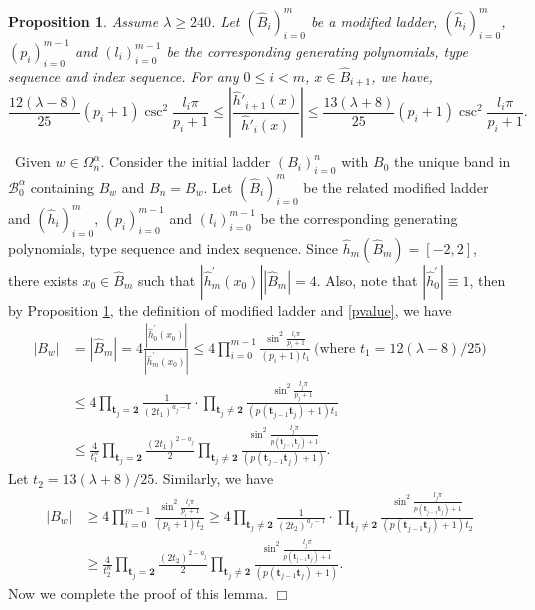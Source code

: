 \documentclass[reqno,11pt,graphicx,]{amsart}
\numberwithin{equation}{section}
\theoremstyle{plain}
\newcommand{\3}{\mathbf{3}}
\newtheorem{proposition}[theorem]{Proposition}
\begin{document}
	\begin{proposition}\label{lm-2}
		Assume $\lambda\ge240$. Let $(\hat{B}_i)_{i=0}^m$ be a modified ladder,
		$(\hat{h}_i)_{i=0}^m$, $(p_i)_{i=0}^{m-1}$ and $(l_i)_{i=0}^{m-1}$
		be the corresponding generating polynomials, type sequence and index sequence.
		For any $0\le i< m$, $x\in \hat{B}_{i+1}$, we have,
		$$\frac{12(\lambda-8)}{25}(p_i+1)\csc^2\frac{l_i\pi}{p_i+1}
		\le\left|\frac{\hat{h}'_{i+1}(x)}{\hat{h}'_{i}(x)}\right|
		\le \frac{13(\lambda+8)}{25}(p_i+1)\csc^2\frac{l_i\pi}{p_i+1}.$$
	\end{proposition}
	
	\smallskip
	
	\
	Given $w\in \Omega^{\alpha}_n.$  Consider the initial ladder $(B_i)_{i=0}^n$ with $B_0$ the unique band in $\mathcal{B}^{\alpha}_0$ containing $B_w$ and $B_n=B_w.$
	Let $(\hat{B}_i)_{i=0}^m$ be the related  modified ladder and
	$(\hat{h}_i)_{i=0}^m$, $(p_i)_{i=0}^{m-1}$ and $(l_i)_{i=0}^{m-1}$
	be the corresponding generating polynomials, type sequence and index
	sequence.
	Since $\hat h_m(\hat B_m)=[-2,2]$, there exists $x_0\in\hat B_m$
	such that $|\hat h_m^\prime(x_0)| |\hat B_m|=4.$
	Also, note that
	$|\hat{h}_{0}^\prime|\equiv 1$,
	then by Proposition \ref{lm-2}, the definition of  modified ladder and \eqref{pvalue}, we have 
	\begin{align*}
		|B_w|&=|\hat{B}_m|= 4\frac{|\hat h_0^\prime(x_0)|}{|\hat h_m^\prime(x_0)|}\le 4
		\prod_{i=0}^{m-1}\frac{\sin^2\frac{l_i\pi}{p_i+1}}{(p_i+1)t_1}\ \text{(where $t_1=12(\lambda-8)/25$)}\\
&\le4\prod_{\mathbf{t}_j=\mathbf{2}}\frac{1}{(2t_1)^{a_j-1}}\cdot \prod_{\mathbf{t}_{j}\neq\mathbf{2}}
		\frac{\sin^2\frac{l_j\pi}{p_j+1}}{(p(\mathbf{t}_{j-1}\mathbf{t}_j)+1)t_1}\\
		&\leq\frac{4}{t_1^n}\prod_{\mathbf{t}_j=\mathbf{2}}\frac{(2t_1)^{2-a_j}}{2}\prod_{\mathbf{t}_j\neq\mathbf{2}}\frac{\sin^2\frac{l_j\pi}{p(\mathbf{t}_{j-1}\mathbf{t}_j)+1}}{(p(\mathbf{t}_{j-1}\mathbf{t}_j)+1)}.
	\end{align*}
Let $t_2=13(\lambda+8)/25$.	Similarly, we have
	\begin{align*}
		|B_w|&\ge  4
		\prod_{i=0}^{m-1}\frac{\sin^2\frac{l_i\pi}{p_i+1}}{(p_i+1)t_2}\ge4\prod_{\mathbf{t}_{j}\neq\mathbf{2}}\frac{1}{(2t_2)^{a_j-1}}\cdot \prod_{\mathbf{t}_j\neq\mathbf{2}}\frac{\sin^2\frac{l_j\pi}{p(\mathbf{t}_{j-1}\mathbf{t}_j)+1}}{(p(\mathbf{t}_{j-1}\mathbf{t}_j)+1)t_2}\\
		&\ge\frac{			4}{t_2^n}\prod_{\mathbf{t}_j=\mathbf{2}}\frac{(2t_2)^{2-a_j}}{2}\prod_{\mathbf{t}_j\neq\mathbf{2}}\frac{\sin^2\frac{l_j\pi}{p(\mathbf{t}_{j-1}\mathbf{t}_j)+1}}{(p(\mathbf{t}_{j-1}\mathbf{t}_j)+1)}.
	\end{align*}
	Now we complete the proof of this lemma.
	\hfill $\Box$
	
\end{document}
